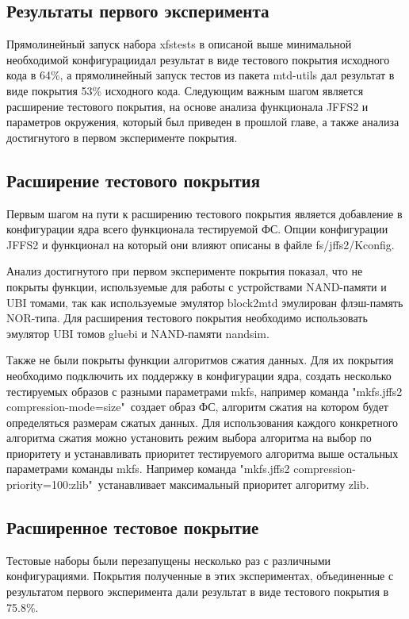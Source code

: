 \subsection{Результаты первого эксперимента}

Прямолинейный запуск набора xfstests в описаной выше минимальной необходимой конфигурациидал результат в виде тестового покрытия исходного кода в 64\%, а прямолинейный запуск тестов из пакета mtd-utils дал результат в виде покрытия 53\% исходного кода. Следующим важным шагом является расширение тестового покрытия, на основе анализа функционала JFFS2 и параметров окружения, который был приведен в прошлой главе, а также анализа достигнутого в первом эксперименте покрытия.

\subsection{Расширение тестового покрытия}

Первым шагом на пути к расширению тестового покрытия является добавление в конфигурации ядра всего функционала тестируемой ФС. Опции конфигурации JFFS2 и функционал на который они влияют описаны в файле fs/jffs2/Kconfig.

Анализ достигнутого при первом эксперименте покрытия показал, что не покрыты функции, используемые для работы с устройствами NAND-памяти и UBI томами, так как используемые эмулятор block2mtd эмулирован флэш-память NOR-типа. Для расширения тестового покрытия необходимо использовать эмулятор UBI томов gluebi и NAND-памяти nandsim.

Также не были покрыты функции алгоритмов сжатия данных. Для их покрытия необходимо подключить их поддержку в конфигурации ядра, создать несколько тестируемых образов с разными параметрами mkfs, например команда "mkfs.jffs2 \-\-compression-mode=size"\ создает образ ФС, алгоритм сжатия на котором будет определяться размерам сжатых данных. Для использования каждого конкретного алгоритма сжатия можно установить режим выбора алгоритма на выбор по приоритету и устанавливать приоритет тестируемого алгоритма выше остальных параметрами команды mkfs. Например команда "mkfs.jffs2 \-\-compression-priority=100:zlib"\ устанавливает максимальный приоритет алгоритму zlib.

\subsection{Расширенное тестовое покрытие}

Тестовые наборы были перезапущены несколько раз с различными конфигурациями. Покрытия полученные в этих экспериментах, объединенные с результатом первого эксперимента дали результат в виде тестового покрытия в 75.8\%.

